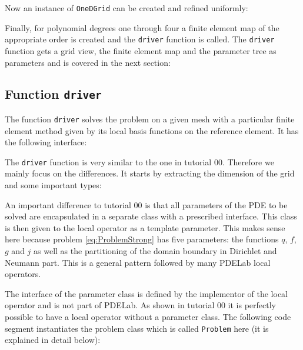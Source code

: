 \documentclass[a4paper,12pt]{article}
\begin{document}
Now an instance of \lstinline{OneDGrid} can be created and
refined uniformly:


Finally, for polynomial degrees one through four a finite element
map of the appropriate order is created and the \lstinline{driver} function
is called. The \lstinline{driver} function gets a grid view, the finite element map
and the parameter tree as parameters and is covered in the next section: 


\subsection{Function \lstinline{driver}}

The function \lstinline{driver} solves the problem on a given mesh 
with a particular finite element method given by its local basis functions
on the reference element. It has the following interface:


The \lstinline{driver} function is very similar to the one in
tutorial 00. Therefore we mainly focus on the differences.
It starts by extracting the dimension of the grid and some 
important types:


An important difference to tutorial 00 is that all parameters 
of the PDE to be solved are encapsulated in a separate class with
a prescribed interface. This class is then given to the local operator
as a template parameter. This makes sense here because problem \eqref{eq:ProblemStrong}
has five parameters: the functions $q$, $f$, $g$ and $j$ as well as
the partitioning of the domain boundary in Dirichlet and Neumann
part. This is a general pattern followed by many PDELab local operators.

The interface of the parameter class is defined by the implementor of the
local operator and is not part of PDELab. As shown in tutorial 00 it is
perfectly possible to have a local operator without a parameter class.
The following code segment instantiates the problem class which 
is called \lstinline{Problem} here (it is explained in detail below):

\end{document}
